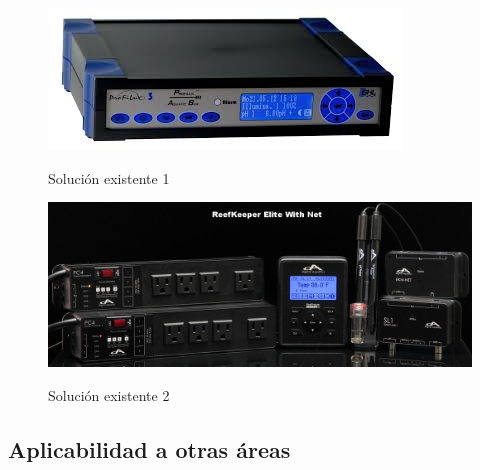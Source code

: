 
\begin{figure}[h!]
	\centering
    \includegraphics[width=.5\textwidth]{./Figures/profilux}
	\label{fig:competencia1}
	\caption{Solución existente 1}
\end{figure}

\begin{figure}[h!]
	\centering
    \includegraphics[width=.5\textwidth]{./Figures/reefkeeper}
	\label{fig:competencia2}
	\caption{Solución existente 2}
\end{figure}


\subsection{Aplicabilidad a otras áreas}





